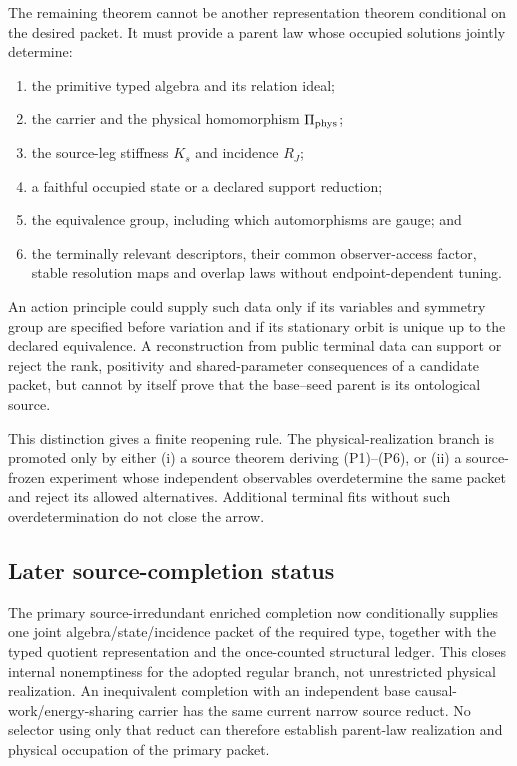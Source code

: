 \documentclass[11pt]{article}
\begin{document}
The remaining theorem cannot be another representation theorem conditional on
the desired packet.  It must provide a parent law whose occupied solutions
jointly determine:
\begin{enumerate}[label=(P\arabic*)]
 \item the primitive typed algebra and its relation ideal;
 \item the carrier and the physical homomorphism \(\Pi_{\rm phys}\);
 \item the source-leg stiffness \(K_s\) and incidence \(R_J\);
 \item a faithful occupied state or a declared support reduction;
 \item the equivalence group, including which automorphisms are gauge; and
 \item the terminally relevant descriptors, their common observer-access
 factor, stable resolution maps and overlap laws without endpoint-dependent
 tuning.
\end{enumerate}
An action principle could supply such data only if its variables and symmetry
group are specified before variation and if its stationary orbit is unique up
to the declared equivalence.  A reconstruction from public terminal data can
support or reject the rank, positivity and shared-parameter consequences of a
candidate packet, but cannot by itself prove that the base--seed parent is its
ontological source.

This distinction gives a finite reopening rule.  The physical-realization branch
is promoted only by either (i) a source theorem deriving (P1)--(P6), or (ii) a
source-frozen experiment whose independent observables overdetermine the same
packet and reject its allowed alternatives.  Additional terminal fits without
such overdetermination do not close the arrow.

\subsection{Later source-completion status}

The primary source-irredundant enriched completion now conditionally supplies
one joint algebra/state/incidence packet of the required type, together with
the typed quotient representation and the once-counted structural ledger.
This closes internal nonemptiness for the adopted regular branch, not
unrestricted physical realization. An inequivalent completion with an independent base
causal-work/energy-sharing carrier has the same current narrow source reduct.
No selector using only that reduct can therefore establish parent-law
realization and physical occupation of the primary packet.
\end{document}
